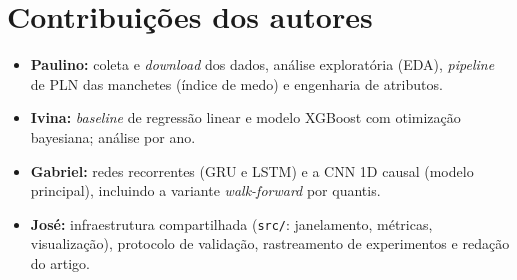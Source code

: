 \documentclass[12pt]{article}
\begin{document}
\section*{Contribuições dos autores}
\begin{itemize}
  \item \textbf{Paulino:} coleta e \emph{download} dos dados, análise
        exploratória (EDA), \emph{pipeline} de PLN das manchetes (índice de
        medo) e engenharia de atributos.
  \item \textbf{Ivina:} \emph{baseline} de regressão linear e modelo
        XGBoost com otimização bayesiana; análise por ano.
  \item \textbf{Gabriel:} redes recorrentes (GRU e LSTM) e a CNN 1D causal
        (modelo principal), incluindo a variante \emph{walk-forward} por
        quantis.
  \item \textbf{José:} infraestrutura compartilhada (\texttt{src/}:
        janelamento, métricas, visualização), protocolo de validação,
        rastreamento de experimentos e redação do artigo.
\end{itemize}



\end{document}
